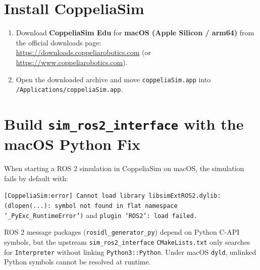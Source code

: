 \documentclass[11pt,a4paper]{article}
\begin{document}
\section{Install CoppeliaSim}

\begin{enumerate}[leftmargin=1.5em]
  \item Download \textbf{CoppeliaSim Edu} for \textbf{macOS (Apple Silicon / arm64)} from the official downloads page:\\
  \url{https://downloads.coppeliarobotics.com} \quad (or \url{https://www.coppeliarobotics.com}).
  \item Open the downloaded archive and move \texttt{coppeliaSim.app} into \texttt{/Applications/coppeliaSim.app}.
\end{enumerate}

\section{Build \texttt{sim\_ros2\_interface} with the macOS Python Fix}

\begin{notebox}
When starting a ROS 2 simulation in CoppeliaSim on macOS, the simulation fails by default with:
\begin{center}
\texttt{[CoppeliaSim:error] Cannot load library libsimExtROS2.dylib: (dlopen(...): symbol not found in flat namespace '\_PyExc\_RuntimeError')} \quad and \quad \texttt{plugin 'ROS2': load failed.}
\end{center}
ROS 2 message packages (\texttt{rosidl\_generator\_py}) depend on Python C-API symbols, but the upstream \texttt{sim\_ros2\_interface} \texttt{CMakeLists.txt} only searches for \texttt{Interpreter} without linking \texttt{Python3::Python}. Under macOS \texttt{dyld}, unlinked Python symbols cannot be resolved at runtime.
\end{notebox}
\end{document}
